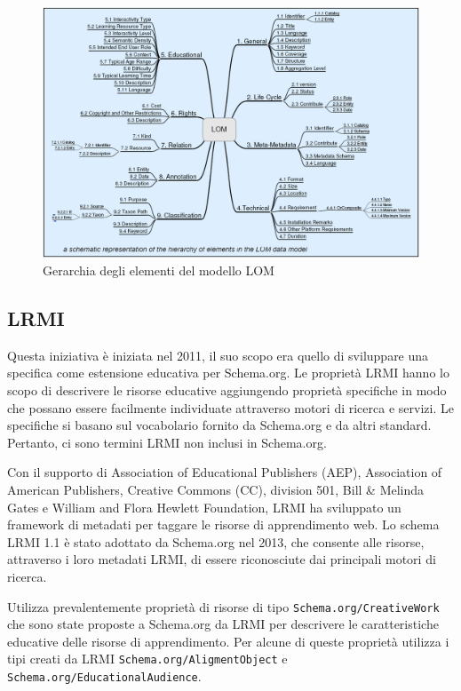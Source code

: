 \begin{figure}[H]
\centering
\includegraphics[scale=0.3]{res/LOM.png}
\caption{Gerarchia degli elementi del modello LOM}
\label{fig:lom}
\end{figure}

\subsection{LRMI}
Questa iniziativa è iniziata nel 2011, il suo scopo era quello di sviluppare una specifica come estensione educativa per Schema.org. Le proprietà LRMI hanno lo scopo di descrivere le risorse educative aggiungendo proprietà specifiche in modo che possano essere facilmente individuate attraverso motori di ricerca e servizi. Le specifiche si basano sul vocabolario fornito da Schema.org e da altri standard. Pertanto, ci sono termini LRMI non inclusi in Schema.org. 

Con il supporto di Association of Educational Publishers (AEP), Association of American Publishers, Creative Commons (CC), division 501, Bill \& Melinda Gates e William and Flora Hewlett Foundation, LRMI ha sviluppato un framework di metadati per taggare le risorse di apprendimento web. Lo schema LRMI 1.1 è stato adottato da Schema.org nel 2013, che consente alle risorse, attraverso i loro metadati LRMI, di essere riconosciute dai principali motori di ricerca.

Utilizza prevalentemente proprietà di risorse di tipo \texttt{Schema.org/CreativeWork} che sono state proposte a Schema.org da LRMI per descrivere le caratteristiche educative delle risorse di apprendimento. Per alcune di queste proprietà utilizza i tipi creati da LRMI \texttt{Schema.org/AligmentObject} e \texttt{Schema.org/EducationalAudience}.

